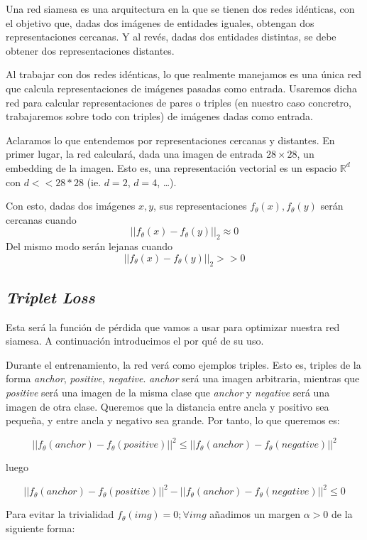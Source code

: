 \documentclass[11pt]{article}
\begin{document}
Una red siamesa es una arquitectura en la que se tienen dos redes idénticas, con el objetivo que, dadas dos imágenes de entidades iguales, obtengan dos representaciones cercanas. Y al revés, dadas dos entidades distintas, se debe obtener dos representaciones distantes.

Al trabajar con dos redes idénticas, lo que realmente manejamos es una única red que calcula representaciones de imágenes pasadas como entrada. Usaremos dicha red para calcular representaciones de pares o triples (en nuestro caso concretro, trabajaremos sobre todo con triples) de imágenes dadas como entrada.

Aclaramos lo que entendemos por representaciones cercanas y distantes. En primer lugar, la red calculará, dada una imagen de entrada $28\times28$, un embedding de la imagen. Esto es, una representación vectorial es un espacio $\mathbb{R}^d$ con $d << 28*28$ (ie. $d = 2$, $d = 4$, \ldots). 

Con esto, dadas dos imágenes $x, y$, sus representaciones $ f_{\theta}(x),  f_{\theta}(y)$ serán cercanas cuando $$|| f_{\theta}(x) - f_{\theta}(y)||_2 \approx 0$$ Del mismo modo serán lejanas cuando $$|| f_{\theta}(x) - f_{\theta}(y)||_2 >> 0$$ 

\pagebreak
\subsection{\emph{Triplet Loss}}

Esta será la función de pérdida que vamos a usar para optimizar nuestra red siamesa. A continuación introducimos el por qué de su uso.

Durante el entrenamiento, la red verá como ejemplos triples. Esto es, triples de la forma \emph{anchor}, \emph{positive}, \emph{negative}. \emph{anchor} será una imagen arbitraria, mientras que \emph{positive} será una imagen de la misma clase que \emph{anchor} y \emph{negative} será una imagen de otra clase. Queremos que la distancia entre ancla y positivo sea pequeña, y entre ancla y negativo sea grande. Por tanto, lo que queremos es:

$$||f_{\theta}(anchor) - f_{\theta}(positive)||^2 \leq ||f_{\theta}(anchor) - f_{\theta}(negative)||^2 $$

luego 

$$||f_{\theta}(anchor) - f_{\theta}(positive)||^2 - ||f_{\theta}(anchor) - f_{\theta}(negative)||^2 \leq 0$$

Para evitar la trivialidad $f_{\theta}(img) = 0; \forall img$ añadimos un margen $\alpha > 0$ de la siguiente forma:
\end{document}
